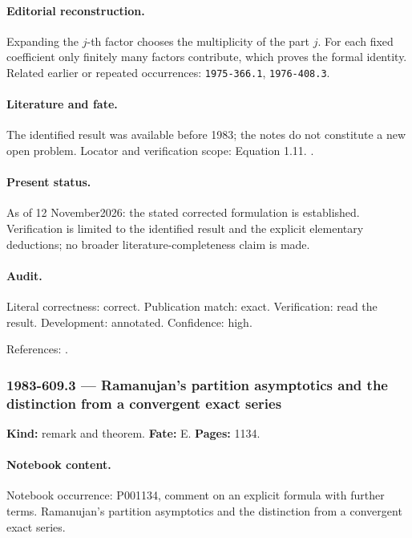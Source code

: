 \paragraph{Editorial reconstruction.} Expanding the \(j\)-th factor chooses the multiplicity of the part \(j\). For each fixed coefficient only finitely many factors contribute, which proves the formal identity. Related earlier or repeated occurrences: \texttt{1975-366.1}, \texttt{1976-408.3}.

\paragraph{Literature and fate.} The identified result was available before 1983; the notes do not constitute a new open problem. Locator and verification scope: Equation 1.11. \cite{hardyramanujan1918asymptotic}.

\paragraph{Present status.} As of 12 November2026: the stated corrected formulation is established. Verification is limited to the identified result and the explicit elementary deductions; no broader literature-completeness claim is made.

\paragraph{Audit.} Literal correctness: correct. Publication match: exact. Verification: read the result. Development: annotated. Confidence: high.

\noindent References: \citep{hardyramanujan1918asymptotic}.\par

\subsubsection{1983-609.3 --- Ramanujan's partition asymptotics and the distinction from a convergent exact series}

\label{item:1983-609.3}

\noindent\textbf{Kind:} remark and theorem. \textbf{Fate:} E. \textbf{Pages:} 1134.\par

\paragraph{Notebook content.} Notebook occurrence: P001134, comment on an explicit formula with further terms. Ramanujan's partition asymptotics and the distinction from a convergent exact series.

